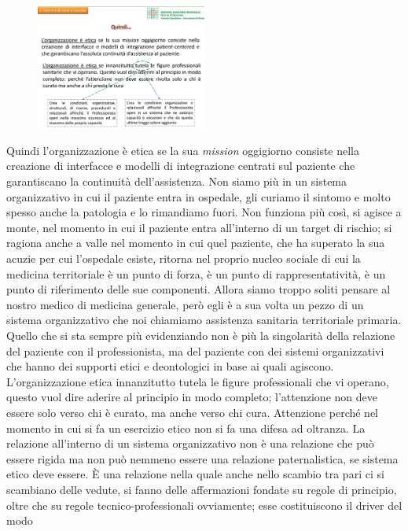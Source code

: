  \begin{figure}[!ht]
\centering
	\includegraphics[width=0.5\textwidth]{32/image7.jpeg}
	\end{figure}

Quindi l'organizzazione è etica se la sua \emph{mission} oggigiorno
consiste nella creazione di interfacce e modelli di integrazione
centrati sul paziente che garantiscano la continuità dell'assistenza.
Non siamo più in un sistema organizzativo in cui il paziente entra in
ospedale, gli curiamo il sintomo e molto spesso anche la patologia e lo
rimandiamo fuori. Non funziona più così, si agisce a monte, nel momento
in cui il paziente entra all'interno di un target di rischio; si ragiona
anche a valle nel momento in cui quel paziente, che ha superato la sua
acuzie per cui l'ospedale esiste, ritorna nel proprio nucleo sociale di
cui la medicina territoriale è un punto di forza, è un punto di
rappresentatività, è un punto di riferimento delle sue componenti.
Allora siamo troppo soliti pensare al nostro medico di medicina
generale, però egli è a sua volta un pezzo di un sistema organizzativo
che noi chiamiamo assistenza sanitaria territoriale primaria. Quello che
si sta sempre più evidenziando non è più la singolarità della relazione
del paziente con il professionista, ma del paziente con dei sistemi
organizzativi che hanno dei supporti etici e deontologici in base ai
quali agiscono. L'organizzazione etica innanzitutto tutela le figure
professionali che vi operano, questo vuol dire aderire al principio in
modo completo; l'attenzione non deve essere solo verso chi è curato, ma
anche verso chi cura. Attenzione perché nel momento in cui si fa un
esercizio etico non si fa una difesa ad oltranza. La relazione
all'interno di un sistema organizzativo non è una relazione che può
essere rigida ma non può nemmeno essere una relazione paternalistica, se
sistema etico deve essere. È una relazione nella quale anche nello
scambio tra pari ci si scambiano delle vedute, si fanno delle
affermazioni fondate su regole di principio, oltre che su regole
tecnico-professionali ovviamente; esse costituiscono il driver del modo
